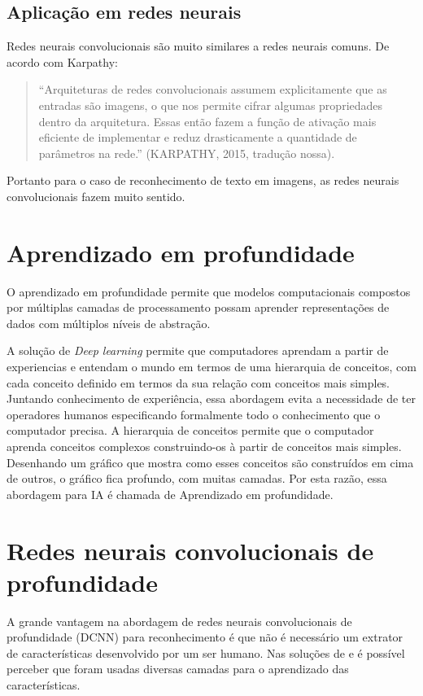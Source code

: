 \subsection{Aplicação em redes neurais}

Redes neurais convolucionais são muito similares a redes neurais
comuns. De acordo com Karpathy\cite{Karpathy}:
\begin{quote}
  ``Arquiteturas de redes convolucionais assumem explicitamente que as
  entradas são imagens, o que nos permite cifrar algumas propriedades
  dentro da arquitetura. Essas então fazem a função de ativação mais
  eficiente de implementar e reduz drasticamente a quantidade de
  parâmetros na rede.'' (KARPATHY\cite{Karpathy}, 2015, tradução nossa).
\end{quote}

Portanto para o caso de reconhecimento de texto em imagens, as redes
neurais convolucionais fazem muito sentido.

\section{Aprendizado em profundidade}

O aprendizado em profundidade permite que modelos computacionais
compostos por múltiplas camadas de processamento possam aprender
representações de dados com múltiplos níveis de abstração\cite{LeCun}.

A solução de \textit{Deep learning} permite que computadores aprendam
a partir de experiencias e entendam o mundo em termos de uma
hierarquia de conceitos, com cada conceito definido em termos da sua
relação com conceitos mais simples. Juntando conhecimento de
experiência, essa abordagem evita a necessidade de ter operadores
humanos especificando formalmente todo o conhecimento que o computador
precisa. A hierarquia de conceitos permite que o computador aprenda
conceitos complexos construindo-os à partir de conceitos mais
simples. Desenhando um gráfico que mostra como esses conceitos são
construídos em cima de outros, o gráfico fica profundo, com muitas
camadas. Por esta razão, essa abordagem para IA é chamada de
Aprendizado em profundidade\cite{Goodfellow-et-al-2016-Book}.

\section{Redes neurais convolucionais de profundidade}

A grande vantagem na abordagem de redes neurais convolucionais de
profundidade (DCNN) para reconhecimento é que não é necessário um
extrator de características desenvolvido por um ser humano. Nas
soluções de \cite{Krizhevsky} e \cite{Goodfellow} é possível perceber
que foram usadas diversas camadas para o aprendizado das
características.

